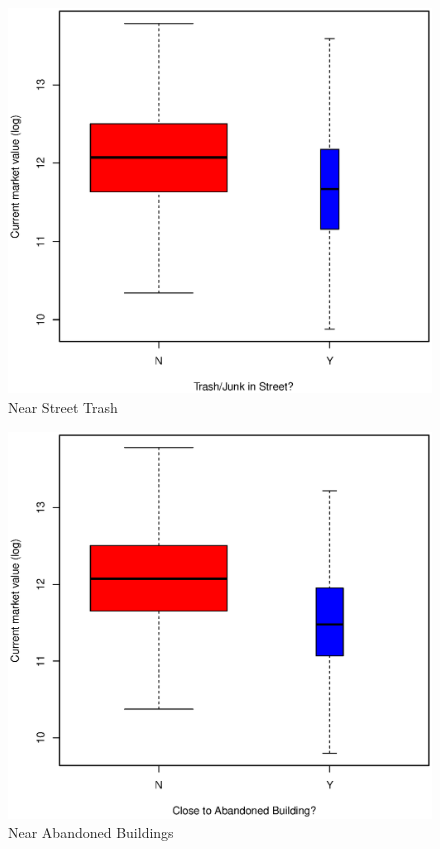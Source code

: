 \documentclass[11pt, fleqn]{article}
\begin{document}
\begin{figure}[!htb]
  \centering
  \includegraphics[scale=.5]{ejunk.eps}
  \caption{Near Street Trash}
  \label{fig:ejunk}
\end{figure}

\begin{figure}[!htb]
  \centering
  \includegraphics[scale=.5]{eaban.eps}
  \caption{Near Abandoned Buildings}
  \label{fig:eaban}
\end{figure}
\end{document}
